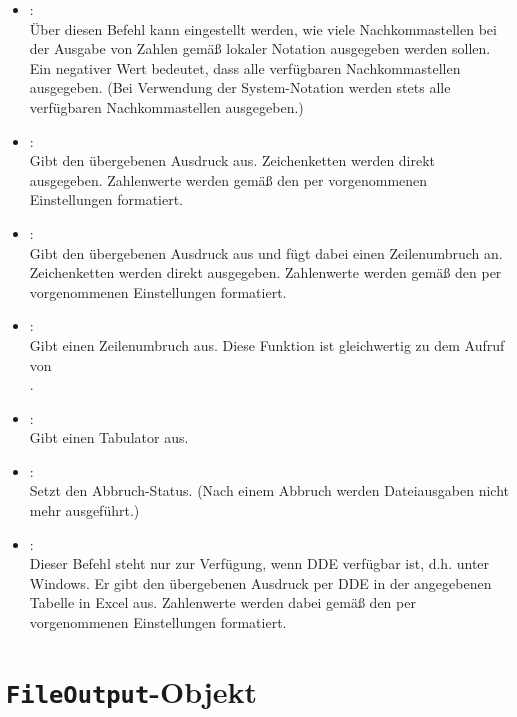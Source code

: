 \begin{itemize}
\item
{}:\\
Über diesen Befehl kann eingestellt werden, wie viele Nachkommastellen bei der
Ausgabe von Zahlen gemäß lokaler Notation ausgegeben werden sollen. Ein
negativer Wert bedeutet, dass alle verfügbaren Nachkommastellen ausgegeben.
(Bei Verwendung der System-Notation werden stets alle verfügbaren Nachkommastellen ausgegeben.)

\item
{}:\\
Gibt den übergebenen Ausdruck aus.
Zeichenketten werden direkt ausgegeben. Zahlenwerte werden gemäß den per
 vorgenommenen Einstellungen formatiert.

\item
{}:\\
Gibt den übergebenen Ausdruck aus und fügt dabei einen Zeilenumbruch an.
Zeichenketten werden direkt ausgegeben. Zahlenwerte werden gemäß den per
 vorgenommenen Einstellungen formatiert.

\item
{}:\\
Gibt einen Zeilenumbruch aus. Diese Funktion ist gleichwertig zu dem Aufruf von\\
.

\item
{}:\\
Gibt einen Tabulator aus.

\item
{}:\\
Setzt den Abbruch-Status. (Nach einem Abbruch werden Dateiausgaben nicht mehr ausgeführt.)

\item
{}:\\
Dieser  Befehl steht nur zur Verfügung, wenn DDE verfügbar ist, d.h. unter Windows.
Er gibt den übergebenen Ausdruck per DDE in der angegebenen Tabelle in Excel aus.
Zahlenwerte werden dabei gemäß den per  vorgenommenen Einstellungen formatiert.

\end{itemize}



\chapter{\texttt{FileOutput}-Objekt}

